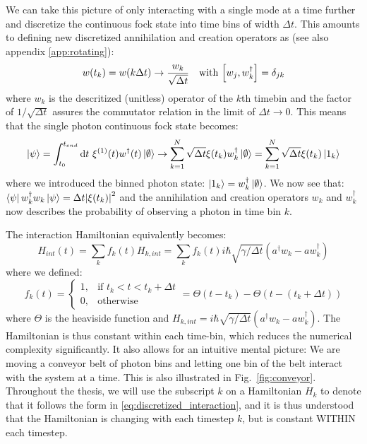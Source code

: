 We can take this picture of only interacting with a single mode at a time further and discretize the continuous fock state into time bins of width $\Delta t$. This amounts to defining new discretized annihilation and creation operators as \cite{Heuck2020Photon-photonCavities} (see also appendix \ref{app:rotating}):
\begin{equation}
     w(t_k) = w(k \Delta t) \rightarrow  \frac{w_k}{\sqrt{\Delta t}} \ \ \  \text{with} \ \comm{w_j}{w_k^\dagger} = \delta_{jk}
\end{equation}
where $w_k$ is the descritized (unitless) operator of the $k$th timebin and the factor of $1/\sqrt{\Delta t}$ assures the commutator relation in the limit of $\Delta t \rightarrow 0$. This means that the single photon continuous fock state becomes:
\begin{equation}
    \ket{\psi} = \int_{t_0}^{t_{end}} \mathrm{d}t \ \xi^{(1)}(t) w^\dagger(t) \ket{\emptyset}  \rightarrow 
\sum_{k=1}^N \sqrt{\Delta t} \xi(t_k) w_k^\dagger \ket{\emptyset} = \sum_{k=1}^N \sqrt{\Delta t} \xi(t_k) \ket{1_k} 
\end{equation}
where we introduced the binned photon state: $\ket{1_k}  = w_k^\dagger \ket{\emptyset}$. We now see that: $\bra{\psi} w_{k}^\dagger w_k \ket{\psi} = \Delta t \abs{\xi(t_k)}^2$ and the annihilation and creation operators $w_k$ and $w_k^\dagger$  now describes the probability of observing a photon in time bin $k$.

The interaction Hamiltonian equivalently becomes:
\begin{equation}
    H_{int}(t) =  \sum_k f_k(t) H_{k,int} = \sum_k f_k(t) i \hbar \sqrt{\gamma/\Delta t} (a^\dagger w_k - a w_k^\dagger) \label{eq:discretized_interaction}
\end{equation}
where we defined:
\begin{equation}
f_k(t) = \begin{cases}
          1, & \text{if } t_k < t <t_k+\Delta t  \\
          0, & \text{otherwise}
\end{cases} = \Theta(t - t_k) - \Theta(t - (t_k + \Delta t)) \label{eq:fk}    
\end{equation}
where $\Theta$ is the heaviside function and $H_{k,int} = i \hbar \sqrt{\gamma/\Delta t} (a^\dagger w_k - a w_k^\dagger)$. The Hamiltonian is thus constant within each time-bin, which reduces the numerical complexity significantly. It also allows for an intuitive mental picture: We are moving a conveyor belt of photon bins and letting one bin of the belt interact with the system at a time. This is also illustrated in Fig.~\ref{fig:conveyor}. Throughout the thesis, we will use the subscript $k$ on a Hamiltonian $H_k$ to denote that it follows the form in \eqref{eq:discretized_interaction}, and it is thus understood that the Hamiltonian is changing with each timestep $k$, but is constant WITHIN each timestep.

